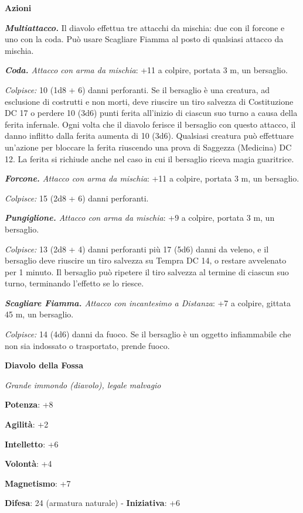 \begin{multicols}{2}
\smallskip\textbf{Azioni}

\emph{\textbf{Multiattacco.}} Il diavolo effettua tre attacchi da
mischia: due con il forcone e uno con la coda. Può usare Scagliare
Fiamma al posto di qualsiasi attacco da mischia.

\emph{\textbf{Coda.} Attacco con arma da mischia}: +11 a colpire,
portata 3 m, un bersaglio.

\emph{Colpisce:} 10 (1d8 + 6) danni perforanti. Se il bersaglio è una
creatura, ad esclusione di costrutti e non morti, deve riuscire un tiro
salvezza di Costituzione DC 17 o perdere 10 (3d6) punti ferita
all'inizio di ciascun suo turno a causa della ferita infernale. Ogni
volta che il diavolo ferisce il bersaglio con questo attacco, il danno
inflitto dalla ferita aumenta di 10 (3d6). Qualsiasi creatura può
effettuare un'azione per bloccare la ferita riuscendo una prova di
Saggezza (Medicina) DC 12. La ferita si richiude anche nel caso in cui
il bersaglio riceva magia guaritrice.

\emph{\textbf{Forcone.} Attacco con arma da mischia}: +11 a colpire,
portata 3 m, un bersaglio.

\emph{Colpisce:} 15 (2d8 + 6) danni perforanti.

\emph{\textbf{Pungiglione.} Attacco con arma da mischia}: +9 a colpire,
portata 3 m, un bersaglio.

\emph{Colpisce:} 13 (2d8 + 4) danni perforanti più 17 (5d6) danni da
veleno, e il bersaglio deve riuscire un tiro salvezza su Tempra DC
14, o restare avvelenato per 1 minuto. Il bersaglio può ripetere il tiro
salvezza al termine di ciascun suo turno, terminando l'effetto se lo
riesce.

\emph{\textbf{Scagliare Fiamma.} Attacco con incantesimo a Distanza}: +7
a colpire, gittata 45 m, un bersaglio.

\emph{Colpisce:} 14 (4d6) danni da fuoco. Se il bersaglio è un oggetto
infiammabile che non sia indossato o trasportato, prende fuoco.

\textbf{Diavolo della Fossa}

\emph{Grande immondo (diavolo), legale malvagio}

\textbf{Potenza}: +8

\textbf{Agilità}: +2

\textbf{Intelletto}: +6

\textbf{Volontà}: +4

\textbf{Magnetismo}: +7

\textbf{Difesa}: 24 (armatura naturale) - \textbf{Iniziativa}: +6


\end{multicols}
